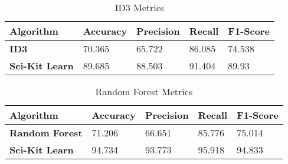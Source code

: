 \begin{table}[ht]
    \centering
    \begin{tabular}{|l|l|l|l|l|}
        \hline
        \textbf{Algorithm}     & \textbf{Accuracy} & \textbf{Precision} & \textbf{Recall} & \textbf{F1-Score} \\
        \hline
        \textbf{ID3}           & 70.365            & 65.722             & 86.085          & 74.538            \\
        \textbf{Sci-Kit Learn} & 89.685            & 88.503             & 91.404          & 89.93             \\
        \hline
    \end{tabular}
    \caption{ID3 Metrics}
    \label{tab:Table5}
\end{table}

\begin{table}[ht]
    \centering
    \begin{tabular}{|l|l|l|l|l|}
        \hline
        \textbf{Algorithm}     & \textbf{Accuracy} & \textbf{Precision} & \textbf{Recall} & \textbf{F1-Score} \\
        \hline
        \textbf{Random Forest} & 71.206            & 66.651             & 85.776          & 75.014            \\
        \textbf{Sci-Kit Learn} & 94.734            & 93.773             & 95.918          & 94.833            \\
        \hline
    \end{tabular}
    \caption{Random Forest Metrics}
    \label{tab:Table6}
\end{table}